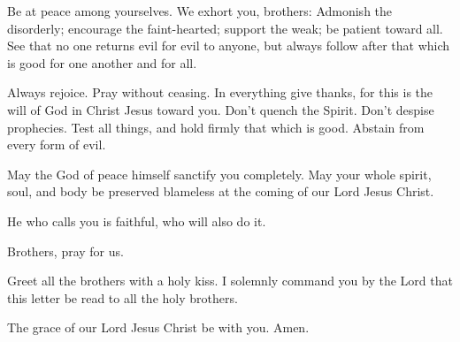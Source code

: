 Be at peace among yourselves.  We exhort you, brothers:
Admonish the disorderly; encourage the faint-hearted; support the weak;
be patient toward all.  See that no one returns evil for
evil to anyone, but always follow after that which is good for one
another and for all.

 Always rejoice.  Pray without ceasing.
 In everything give thanks, for this is the will of God in
Christ Jesus toward you.  Don't quench the Spirit.
 Don't despise prophecies.  Test all things,
and hold firmly that which is good.  Abstain from every
form of evil.

 May the God of peace himself sanctify you completely. May
your whole spirit, soul, and body be preserved blameless at the coming
of our Lord Jesus Christ.

 He who calls you is faithful, who will also do it.

 Brothers, pray for us.

 Greet all the brothers with a holy kiss.  I
solemnly command you by the Lord that this letter be read to all the
holy brothers.

 The grace of our Lord Jesus Christ be with you. Amen.
